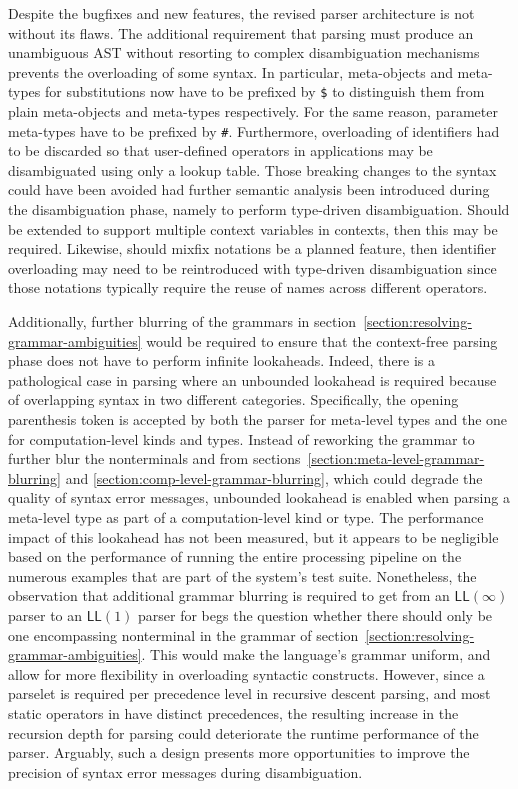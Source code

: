 Despite the bugfixes and new features, the revised parser architecture is not without its flaws.
The additional requirement that parsing must produce an unambiguous \ac{AST} without resorting to complex disambiguation mechanisms prevents the overloading of some syntax.
In particular, meta-objects and meta-types for substitutions now have to be prefixed by \texttt{\$} to distinguish them from plain meta-objects and meta-types respectively.
For the same reason, parameter meta-types have to be prefixed by \texttt{\#}.
Furthermore, overloading of identifiers had to be discarded so that user-defined operators in applications may be disambiguated using only a lookup table.
Those breaking changes to the syntax could have been avoided had further semantic analysis been introduced during the disambiguation phase, namely to perform type-driven disambiguation.
Should \Beluga be extended to support multiple context variables in contexts, then this may be required.
Likewise, should mixfix notations be a planned feature, then identifier overloading may need to be reintroduced with type-driven disambiguation since those notations typically require the reuse of names across different operators.

Additionally, further blurring of the grammars in section~\ref{section:resolving-grammar-ambiguities} would be required to ensure that the context-free parsing phase does not have to perform infinite lookaheads.
Indeed, there is a pathological case in parsing where an unbounded lookahead is required because of overlapping syntax in two different categories.
Specifically, the opening parenthesis token is accepted by both the parser for meta-level types and the one for computation-level kinds and types.
Instead of reworking the grammar to further blur the nonterminals  and  from sections~\ref{section:meta-level-grammar-blurring} and \ref{section:comp-level-grammar-blurring}, which could degrade the quality of syntax error messages, unbounded lookahead is enabled when parsing a meta-level type as part of a computation-level kind or type.
The performance impact of this lookahead has not been measured, but it appears to be negligible based on the performance of running the entire processing pipeline on the numerous examples that are part of the system's test suite.
Nonetheless, the observation that additional grammar blurring is required to get from an $ \mathsf{LL}(\infty) $ parser to an $ \mathsf{LL}(1) $ parser for \Beluga begs the question whether there should only be one encompassing nonterminal in the grammar of section~\ref{section:resolving-grammar-ambiguities}.
This would make the language's grammar uniform, and allow for more flexibility in overloading syntactic constructs.
However, since a parselet is required per precedence level in recursive descent parsing, and most static operators in \Beluga have distinct precedences, the resulting increase in the recursion depth for parsing could deteriorate the runtime performance of the parser.
Arguably, such a design presents more opportunities to improve the precision of syntax error messages during disambiguation.
